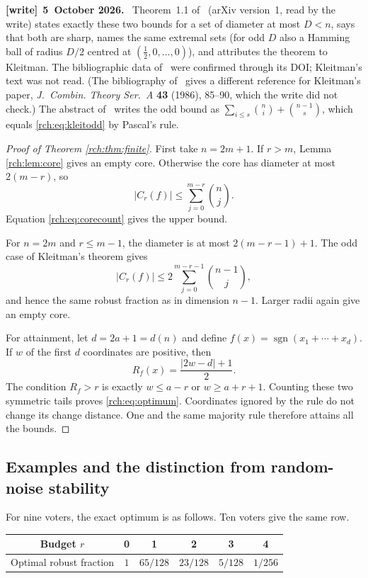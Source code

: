 \documentclass[11pt]{article}
\theoremstyle{definition}
\theoremstyle{remark}
\newenvironment{writenote}[1][]{\par\smallskip\begingroup\small
 \noindent\textbf{[write]}\if\relax\detokenize{#1}\relax\else~\textbf{#1.}\fi\ }%
 {\par\endgroup\smallskip}
\begin{document}
\begin{writenote}[5~October 2026]
Theorem~1.1 of~\cite{HKP} (arXiv version~1, read by the write) states
exactly these two bounds for a set of diameter at most $D<n$, says that both
are sharp, names the same extremal sets (for odd $D$ also a Hamming ball of
radius $D/2$ centred at $(\frac12,0,\ldots,0)$), and attributes the theorem
to Kleitman. The bibliographic data of~\cite{Kleitman} were confirmed
through its DOI; Kleitman's text was not read. (The bibliography
of~\cite{HKP} gives a different reference for Kleitman's paper,
\emph{J.~Combin. Theory Ser.~A} \textbf{43} (1986), 85--90, which the write
did not check.) The abstract of~\cite{WuEtAl} writes the odd bound as
$\sum_{i\le s}\binom ni+\binom{n-1}s$, which equals \eqref{rch:eq:kleitodd}
by Pascal's rule.
\end{writenote}

\begin{proof}[Proof of Theorem \ref{rch:thm:finite}]
First take \(n=2m+1\). If \(r>m\), Lemma \ref{rch:lem:core} gives an empty core.
Otherwise the core has diameter at most \(2(m-r)\), so
\[
 |C_r(f)|\le\sum_{j=0}^{m-r}\binom nj.
\]
Equation \eqref{rch:eq:corecount} gives the upper bound.

For \(n=2m\) and \(r\le m-1\), the diameter is at most
\(2(m-r-1)+1\). The odd case of Kleitman's theorem gives
\[
 |C_r(f)|\le2\sum_{j=0}^{m-r-1}\binom{n-1}j,
\]
and hence the same robust fraction as in dimension \(n-1\). Larger radii again
give an empty core.

For attainment, let \(d=2a+1=d(n)\) and define
\(f(x)=\operatorname{sgn}(x_1+\cdots+x_d)\). If \(w\) of the first \(d\)
coordinates are positive, then
\[
 R_f(x)=\frac{|2w-d|+1}{2}.
\]
The condition \(R_f>r\) is exactly
\(w\le a-r\) or \(w\ge a+r+1\). Counting these two symmetric tails proves
\eqref{rch:eq:optimum}. Coordinates ignored by the rule do not change its change
distance. One and the same majority rule therefore attains all the bounds.
\end{proof}

\subsection{Examples and the distinction from random-noise stability}

For nine voters, the exact optimum is as follows. Ten voters give the same row.

\begin{center}
\begin{tabular}{c c c c c c}
\toprule
Budget \(r\) & 0 & 1 & 2 & 3 & 4\\
\midrule
Optimal robust fraction & \(1\) & \(65/128\) & \(23/128\) & \(5/128\) & \(1/256\)\\
\bottomrule
\end{tabular}
\end{center}
\end{document}
